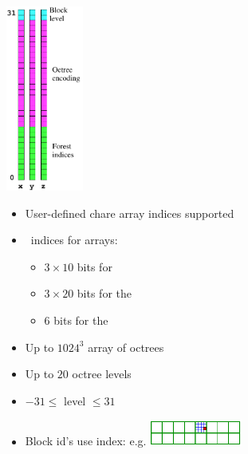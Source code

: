 \begin{frame}[fragile] 
\secframetitle{\ssCharmCello}
\begin{center}
\begin{minipage}{1.00in}
\includegraphics[width=1.0in]{index.pdf}
\end{minipage}
\begin{minipage}{3.25in}
\begin{itemize}
\item User-defined chare array indices supported
\item \cello\ indices for  arrays:
\begin{itemize}
\item $3 \times 10 $ bits for  
\item $3 \times 20 $ bits for the 
\item $6$ bits for the 
\end{itemize}
\item Up to $1024^3$ array of octrees
\item Up to $20$ octree levels
\item $-31 \le$ level $\le 31$
\item Block id's use index: e.g. 
\includegraphics[width=1.2in]{block-index.pdf}
\end{itemize}
\end{minipage}
\end{center}
\end{frame}


